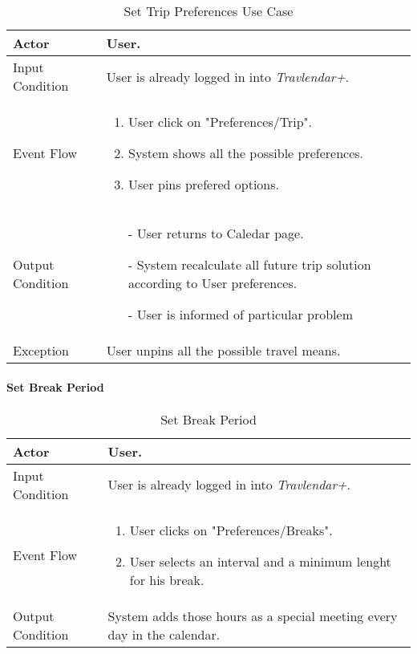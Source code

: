 		\begin{table}[H]
			\begin{tabular}{| l | p{} | }
				\hline
				\hline
				Actor	&		User. \\
				\hline
				Input Condition		&		User is already logged in into \textit{Travlendar+}. \\
				\hline
				Event Flow		&		\begin{enumerate}
													\item User click on "Preferences/Trip".
													\item System shows all the possible preferences.
													\item User pins prefered options.
												\end{enumerate} \\
				\hline
				Output Condition		&		\begin{itemize}
														\item[-] User returns to Caledar page.
														\item[-] System recalculate all future trip solution according to User preferences.
														\item[-] User is informed of particular problem
													\end{itemize} \\
				\hline
				Exception		&		User unpins all the possible travel means. \\	
				\hline
				\hline
			\end{tabular}
			\caption{Set Trip Preferences Use Case}
		\end{table}
		

	\paragraph{Set Break Period}
		
		\begin{table}[H]
			\begin{tabular}{| l | p{} | }
				\hline
				\hline
				Actor	&		User. \\
				\hline
				Input Condition		&		User is already logged in into \textit{Travlendar+}. \\
				\hline
				Event Flow		&		\begin{enumerate}
													\item User clicks on "Preferences/Breaks".
													\item User selects an interval and a minimum lenght for his break.
												\end{enumerate} \\
				\hline
				Output Condition		&		System adds those hours as a special meeting every day in the calendar. \\
				\hline
				\hline
			\end{tabular}
			\caption{Set Break Period}
		\end{table}